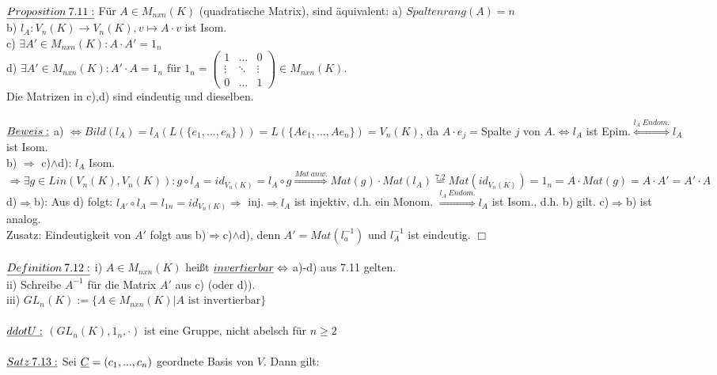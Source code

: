 \documentclass[fleqn, a4paper, 11pt]{article}
\begin{document}
$\uline{Proposition\:7.11:}$ F\"ur $A\in M_{nxn}(K)$ (quadratische Matrix), sind \"aquivalent: a) $Spaltenrang(A)=n$ \\
b) $l_A:V_n(K)\rightarrow V_n(K),v\mapsto A\cdot v$ ist Isom.\\
c) $\exists A'\in M_{nxn}(K):A\cdot A'=1_n$\\
d) $\exists A'\in M_{nxn}(K):A'\cdot A=1_n$ f\"ur $1_n=\begin{pmatrix}
	1 & \dots & 0\\
	\vdots & \ddots & \vdots\\
	0 & \dots & 1
\end{pmatrix}\in M_{nxn}(K)$.\\
Die Matrizen in c),d) sind eindeutig und dieselben.\\
\\
$\uline{Beweis:}$ a) $\Leftrightarrow Bild(l_A)=l_A(L(\{e_1,...,e_n\}))=L(\{Ae_1,...,Ae_n\})=V_n(K)$, da $A\cdot e_j=$Spalte $j$ von $A$.$\Leftrightarrow l_A$ ist Epim.$\stackrel{l_A\:Endom.}{\Leftrightarrow}l_A$ ist Isom.\\
b) $\Rightarrow$ c)$\wedge$d): $l_A$ Isom. $\Rightarrow\exists g\in Lin(V_n(K),V_n(K)):g\circ l_A=id_{V_n(K)}=l_A\circ g\stackrel{Mat\:anw.}{\Rightarrow}Mat(g)\cdot Mat(l_A)\stackrel{7.2}{=}Mat(id_{V_n(K)})=1_n=A\cdot Mat(g)=A\cdot A'=A'\cdot A$\\
d)$\Rightarrow$b): Aus d) folgt: $l_{A'}\circ l_A=l_{1n}=id_{V_n(K)}\Rightarrow$ inj.$\Rightarrow l_A$ ist injektiv, d.h. ein Monom. $\stackrel{l_A\:Endom.}{\Rightarrow}l_A$ ist Isom., d.h. b) gilt. c)$\Rightarrow$b) ist analog.\\
Zusatz: Eindeutigkeit von $A'$ folgt aus b)$\Rightarrow$c)$\wedge$d), denn $A'=Mat(l_a^{-1})$ und $l_A^{-1}$ ist eindeutig. \hfill $\Box$\\
\\
$\uline{Definition\:7.12:}$ i) $A\in M_{nxn}(K)$ hei\ss{}t $\uline{invertierbar}\Leftrightarrow$ a)-d) aus 7.11 gelten.\\
ii) Schreibe $A^{-1}$ f\"ur die Matrix $A'$ aus c) (oder d)).\\
iii) $GL_n(K):=\{A\in M_{nxn}(K)|A\text{ ist invertierbar}\}$\\
\\
$\uline{ddot{U}:}$ $(GL_n(K),1_n,\cdot)$ ist eine Gruppe, nicht abelsch f\"ur $n\geq 2$\\
\\
$\uline{Satz\:7.13:}$ Sei $\uline{C}=(c_1,...,c_n)$ geordnete Basis von $V$. Dann gilt:\\
\end{document}
